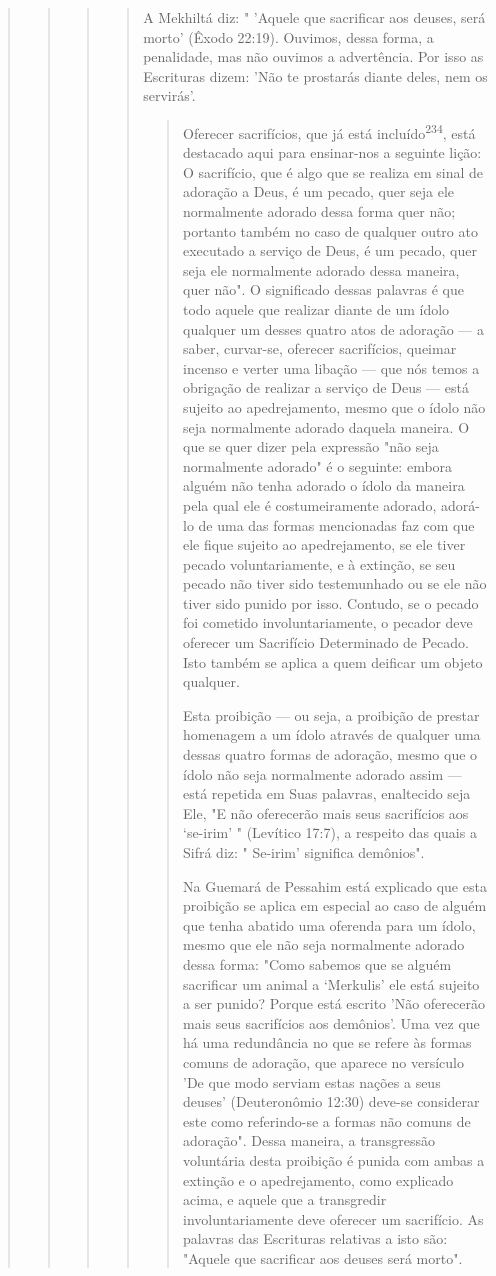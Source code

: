 \begin{quote}
\begin{quote}
\begin{quote}
\begin{quote}
A Mekhiltá diz: " 'Aquele que sacrificar aos deuses, será morto' (Êxo­do
22:19). Ouvimos, dessa forma, a penalidade, mas não ouvimos a
advertên­cia. Por isso as Escrituras dizem: 'Não te prostarás diante
deles, nem os servirás'.


\begin{quote}
Oferecer sacrifícios, que já está incluído\textsuperscript{234}, está
destacado aqui para ensinar-nos a seguinte lição: O sacrifício, que é
algo que se realiza em sinal de adoração a Deus, é um pecado, quer seja
ele normalmente adorado dessa forma quer não; portanto também no caso de
qualquer outro ato executado a serviço de Deus, é um pecado, quer seja
ele normalmente adorado dessa maneira, quer não". O significado dessas
palavras é que todo aquele que realizar diante de um ídolo qualquer um
desses quatro atos de adoração --- a saber, curvar-se, oferecer
sa­crifícios, queimar incenso e verter uma libação --- que nós temos a
obrigação de realizar a serviço de Deus --- está sujeito ao
apedrejamento, mesmo que o ídolo não seja normalmente adorado daquela
maneira. O que se quer dizer pela expressão "não seja normalmente
adorado" é o seguinte: embora alguém não tenha adorado o ídolo da
maneira pela qual ele é costumeiramente adorado, adorá-lo de uma das
formas mencionadas faz com que ele fique sujeito ao ape­drejamento, se
ele tiver pecado voluntariamente, e à extinção, se seu pecado não tiver
sido testemunhado ou se ele não tiver sido punido por isso. Contudo, se
o pecado foi cometido involuntariamente, o pecador deve oferecer um
Sa­crifício Determinado de Pecado. Isto também se aplica a quem deificar
um ob­jeto qualquer.

Esta proibição --- ou seja, a proibição de prestar homenagem a um ídolo
através de qualquer uma dessas quatro formas de adoração, mesmo que o
ídolo não seja normalmente adorado assim --- está repetida em Suas
palavras, enaltecido seja Ele, "E não oferecerão mais seus sacrifícios
aos `se-irim' " (Leví­tico 17:7), a respeito das quais a Sifrá diz: "
Se-irim' significa demônios".

Na Guemará de Pessahim está explicado que esta proibição se aplica em
especial ao caso de alguém que tenha abatido uma oferenda para um ídolo,
mesmo que ele não seja normalmente adorado dessa forma: "Como sabemos
que se alguém sacrificar um animal a `Merkulis' ele está sujeito a ser
punido? Por­que está escrito 'Não oferecerão mais seus sacrifícios aos
demônios'. Uma vez que há uma redundância no que se refere às formas
comuns de adoração, que aparece no versículo 'De que modo serviam estas
nações a seus deuses' (Deute­ronômio 12:30) deve-se considerar este como
referindo-se a formas não comuns de adoração". Dessa maneira, a
transgressão voluntária desta proibição é puni­da com ambas a extinção e
o apedrejamento, como explicado acima, e aquele que a transgredir
involuntariamente deve oferecer um sacrifício. As palavras das
Escrituras relativas a isto são: "Aquele que sacrificar aos deuses será
morto".
\end{quote}


\end{quote}
\end{quote}
\end{quote}
\end{quote}
